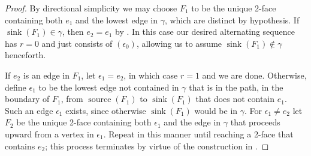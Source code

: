 \documentclass[12pt]{amsart}
\theoremstyle{plain}
\theoremstyle{definition}
\theoremstyle{remark}
\DeclareMathOperator{\sink}{sink}
\DeclareMathOperator{\srce}{source}
\begin{document}
\begin{proof}
By directional simplicity we may choose $F_1$ to be the unique 2-face containing both $e_1$ and the lowest edge in $\gamma$, which are distinct by hypothesis. If $\sink (F_1) \in \gamma$, then  $e_2 = e_1$ by .  In this case our desired alternating sequence has $r=0$ and just consists of $(\epsilon_0)$, allowing us to assume $\sink (F_1)\not\in \gamma $ henceforth.
  
 If $e_2$ is an edge in $F_1$, let $\epsilon_1=e_2$, in which case $r=1$ and we are done. Otherwise, define $\epsilon_1$ to be the lowest edge not contained in $\gamma$ that is in the path, in the boundary of $F_1$, from $\srce(F_1)$ to $\sink(F_1)$ that does not contain $e_1$. Such an edge $\epsilon_1$ exists, since otherwise $\sink(F_1)$ would be in $\gamma$. For $\epsilon_1 \ne e_2$ let $F_2$ be the unique 2-face containing both $\epsilon_1$ and the edge in $\gamma$ that proceeds upward from a vertex in  $\epsilon_1$.  Repeat in this manner until reaching a 2-face that contains $e_2$; this process terminates by virtue of the construction in . 
\end{proof}
\end{document}
